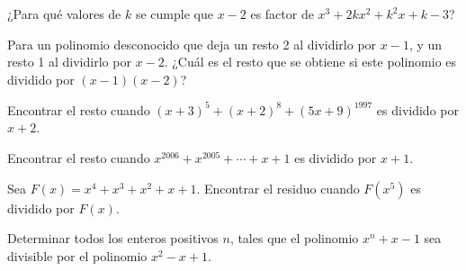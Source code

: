 \begin{multicols}{2}
    \begin{problem}
        ¿Para qué valores de $k$ se cumple que $x - 2$ es factor de $x^3 + 2kx^2 + k^2 x + k - 3$?
    \end{problem}

    \begin{problem}
        Para un polinomio desconocido que deja un resto 2 al dividirlo por $x - 1$, y un resto 1 al dividirlo por $x - 2$.
        ¿Cuál es el resto que se obtiene si este polinomio es dividido por $(x - 1)(x - 2)$?
    \end{problem}

    \begin{problem}
        Encontrar el resto cuando $(x + 3)^5 + (x + 2)^8 + (5x + 9)^{1997}$ es dividido por $x + 2$.
    \end{problem}

    \begin{problem}
        Encontrar el resto cuando $x^{2006} + x^{2005} + \cdots + x + 1$ es dividido por $x + 1$.
    \end{problem}

    \begin{problem}
        Sea $F(x) = x^4 + x^3 + x^2 + x + 1$.
        Encontrar el residuo cuando $F(x^5)$ es dividido por $F(x)$.
    \end{problem}

    \begin{problem}
        Determinar todos los enteros positivos $n$, tales que el polinomio $x^n + x - 1$ sea divisible por el polinomio $x^2 - x + 1$.
    \end{problem}
\end{multicols}